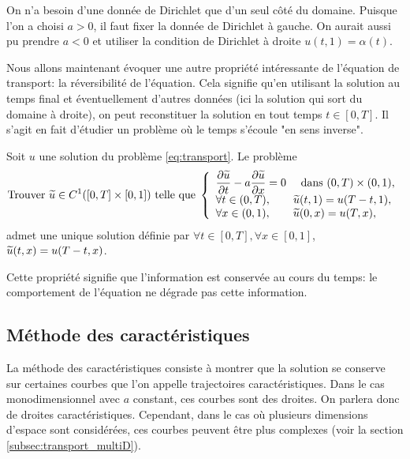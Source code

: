 \documentclass[12pt,a4paper,twoside]{article}
\begin{document}
\begin{remark}
  On n'a besoin d'une donn\'ee de Dirichlet que d'un seul c\^ot\'e du domaine.
  Puisque l'on a choisi $a > 0$, il faut fixer la donn\'ee de Dirichlet \`a gauche.
  On aurait aussi pu prendre $a < 0$ et utiliser la condition de Dirichlet \`a droite
  $u(t,1) = \alpha(t)$.
\end{remark}


Nous allons maintenant \'evoquer une autre propri\'et\'e int\'eressante de l'\'equation
de transport: la r\'eversibilit\'e de l'\'equation.
Cela signifie qu'en utilisant la solution au temps final et \'eventuellement d'autres donn\'ees
(ici la solution qui sort du domaine \`a droite), on peut reconstituer la solution
en tout temps $t \in [0,T]$.
Il s'agit en fait d'\'etudier un probl\`eme o\`u le temps s'\'ecoule 
"en sens inverse".

\begin{proposition}
  \label{prop:transport_rev}
  Soit $u$ une solution du probl\`eme \eqref{eq:transport}.
  Le probl\`eme
  \begin{equation}
    \label{eq:transport_rev}
    \text{Trouver $\widetilde{u} \in C^1([0,T] \times [0,1] )$ telle que} \;
    \left\{
      \begin{array}{l}
        \dfrac{\partial \widetilde{u}}{\partial t} - a \dfrac{\partial \widetilde{u}}{\partial x} = 0 
        \quad \text{ dans } (0,T) \times (0,1),
        \\
        \forall t \in (0,T), \qquad \widetilde{u}(t,1) = u(T-t,1) ,
        \\
        \forall x \in (0,1), \qquad \widetilde{u}(0,x) = u(T,x) ,
      \end{array}
    \right.
  \end{equation}
  admet une unique solution d\'efinie par
  $\forall t \in [0,T], \forall x \in [0,1]$, 
  $\widetilde{u}(t,x) = u(T-t,x)$. 
\end{proposition}

Cette propri\'et\'e signifie que l'information est conserv\'ee au cours du temps:
le comportement de l'\'equation ne d\'egrade pas cette information.


\subsection{M\'ethode des caract\'eristiques}

La m\'ethode des caract\'eristiques consiste \`a montrer que la solution
se conserve sur certaines courbes que l'on appelle trajectoires caract\'eristiques.
Dans le cas monodimensionnel avec $a$ constant, ces courbes sont des droites.
On parlera donc de droites caract\'eristiques.
Cependant, dans le cas o\`u plusieurs dimensions d'espace sont consid\'er\'ees,
ces courbes peuvent \^etre plus complexes (voir la section \ref{subsec:transport_multiD}).
\end{document}
